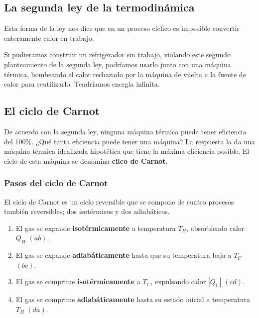 \documentclass[12pt]{article}
\begin{document}
  \subsection{La segunda ley de la termodinámica}

  \vspace{0.2cm}

  Esta forma de la ley nos dice que en un proceso cíclico es imposible convertir enteramente calor en trabajo.

  \vspace{0.2cm}

  Si pudieramos construir un refrigerador sin trabajo, violando este segundo planteamiento de la segunda ley, podríamos usarlo junto con una máquina térmica, bombeando el calor rechazado por la máquina de vuelta a la fuente de calor para reutilizarlo. Tendríamos energía infinita.

  \subsection{El ciclo de Carnot}
  De acuerdo con la segunda ley, ninguna máquina térmica puede tener eficiencia del 100\%. ¿Qué tanta eficiencia puede tener una máquina? La respuesta la da una máquina térmica idealizada hipotética que tiene la máxima eficiencia posible. El ciclo de esta máquina se denomina \textbf{cilco de Carnot}.


  \subsubsection{Pasos del ciclo de Carnot}
  El ciclo de Carnot es un ciclo reversible que se compone de cuatro procesos también reversibles; dos isotérmicos y dos adiabáticos.

  \begin{enumerate}[1.]
    \item El gas se expande \textbf{isotérmicamente} a temperatura $ T_{H} $, absorbiendo calor $ Q_{H} $ $ (ab) $.

    \item El gas se expande \textbf{adiabáticamente} hasta que su temperatura baja a $ T_{C} $ $ (bc) $.

    \item El gas se comprime \textbf{isotérmicamente} a $ T_{C} $, expulsando calor $ \left|Q_{C}\right| $ $ (cd) $.

    \item El gas se comprime \textbf{adiabáticamente} hasta su estado inicial a temperatura $ T_{H} $ $ (da) $.
  \end{enumerate}
\end{document}
